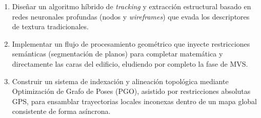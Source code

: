 \begin{enumerate}
    \item Diseñar un algoritmo híbrido de \textit{tracking} y extracción estructural basado en redes neuronales profundas (nodos y \textit{wireframes}) que evada los descriptores de textura tradicionales.
    \item Implementar un flujo de procesamiento geométrico que inyecte restricciones semánticas (segmentación de planos) para completar matemática y directamente las caras del edificio, eludiendo por completo la fase de MVS.
    \item Construir un sistema de indexación y alineación topológica mediante Optimización de Grafo de Poses (PGO), asistido por restricciones absolutas GPS, para ensamblar trayectorias locales inconexas dentro de un mapa global consistente de forma asíncrona.
\end{enumerate}